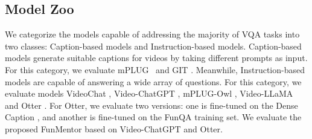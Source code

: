 \subsection{Model Zoo}
We categorize the models capable of addressing the majority of VQA tasks into two classes: Caption-based models and Instruction-based models. Caption-based models generate suitable captions for videos by taking different prompts as input. For this category, we evaluate mPLUG~\cite{li2022mplug} and GIT \cite{wang2022git}. Meanwhile, Instruction-based models are capable of answering a wide array of questions. For this category, we evaluate models VideoChat \cite{2023videochat}, Video-ChatGPT \cite{maaz2023videochatgpt}, mPLUG-Owl \cite{ye2023mplugowl}, Video-LLaMA \cite{damonlpsg2023videollama} and Otter \cite{li2023otter}.
For Otter, we evaluate two versions: one is fine-tuned on the Dense Caption \cite{krishna2017dense}, and another is fine-tuned on the FunQA training set. We evaluate the proposed FunMentor based on Video-ChatGPT and Otter.

